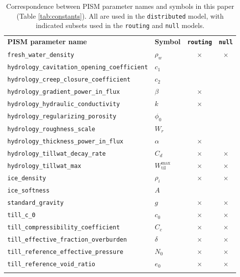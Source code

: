 \documentclass[gmd]{copernicus}   %
\begin{document}
\begin{table}[t]
  \caption{Correspondence between PISM parameter names and symbols in this paper (Table \ref{tab:constants}).  All are used in the \texttt{distributed} model, with indicated subsets used in the \texttt{routing} and \texttt{null} models.} \vskip4mm \centering
  \begin{tabular}{llcc} \tophline
    \textbf{PISM parameter name} & \textbf{Symbol} & \textbf{\texttt{routing}} & \textbf{\texttt{null}} \\
    \middlehline
    \verb|fresh_water_density| & $\rho_w$ & $\times$ & $\times$ \\
    \verb|hydrology_cavitation_opening_coefficient| & $c_1$ \\
    \verb|hydrology_creep_closure_coefficient| & $c_2$ \\
    \verb|hydrology_gradient_power_in_flux| &  $\beta$ & $\times$ & \\
    \verb|hydrology_hydraulic_conductivity| & $k$ & $\times$ & \\
    \verb|hydrology_regularizing_porosity| & $\phi_0$ \\
    \verb|hydrology_roughness_scale| & $W_r$ \\
    \verb|hydrology_thickness_power_in_flux| &  $\alpha$ & $\times$ & \\
    \verb|hydrology_tillwat_decay_rate| & $C_d$ & $\times$ & $\times$ \\
    \verb|hydrology_tillwat_max| & $W_{\text{til}}^{\text{max}}$ & $\times$ & $\times$ \\
    \verb|ice_density| & $\rho_i$ & $\times$ & $\times$ \\
    \verb|ice_softness| & $A$ \\
    \verb|standard_gravity| & $g$ & $\times$ & $\times$ \\
    \verb|till_c_0| & $c_0$ & $\times$ & $\times$ \\
    \verb|till_compressibility_coefficient| & $C_c$ & $\times$ & $\times$ \\
    \verb|till_effective_fraction_overburden| & $\delta$ & $\times$ & $\times$ \\
    \verb|till_reference_effective_pressure| & $N_0$ & $\times$ & $\times$ \\
    \verb|till_reference_void_ratio| & $e_0$ & $\times$ & $\times$ \\
    \bottomhline
  \end{tabular}
  \label{tab:correspondence}
\end{table}
\end{document}
